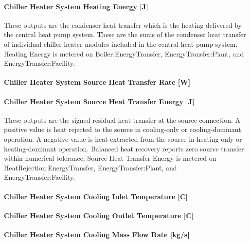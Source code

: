 \paragraph{Chiller Heater System Heating Energy {[}J{]}}\label{chiller-heater-system-heating-energy-j}

These outputs are the condenser heat transfer which is the heating delivered by the central heat pump system. These are the sums of the condenser heat transfer of individual chiller-heater modules included in the central heat pump system. Heating Energy is metered on Boiler:EnergyTransfer, EnergyTransfer:Plant, and EnergyTransfer:Facility.

\paragraph{Chiller Heater System Source Heat Transfer Rate {[}W{]}}\label{chiller-heater-system-source-heat-transfer-rate-w}

\paragraph{Chiller Heater System Source Heat Transfer Energy {[}J{]}}\label{chiller-heater-system-source-heat-transfer-energy-j}

These outputs are the signed residual heat transfer at the source connection. A positive value is heat rejected to the source in cooling-only or cooling-dominant operation. A negative value is heat extracted from the source in heating-only or heating-dominant operation. Balanced heat recovery reports zero source transfer within numerical tolerance. Source Heat Transfer Energy is metered on HeatRejection:EnergyTransfer, EnergyTransfer:Plant, and EnergyTransfer:Facility.

\paragraph{Chiller Heater System Cooling Inlet Temperature {[}C{]}}\label{chiller-heater-system-cooling-inlet-temperature-c}

\paragraph{Chiller Heater System Cooling Outlet Temperature {[}C{]}}\label{chiller-heater-system-cooling-outlet-temperature-c}

\paragraph{Chiller Heater System Cooling Mass Flow Rate {[}kg/s{]}}\label{chiller-heater-system-cooling-mass-flow-rate-kgs}

